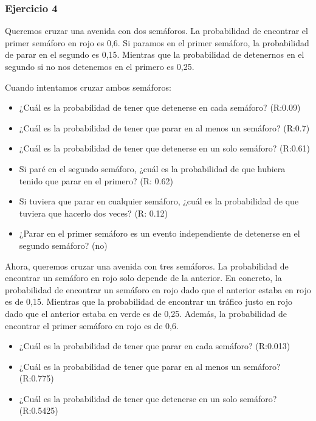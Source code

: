 \documentclass[
]{book}
\providecommand{\tightlist}{%
  \setlength{\itemsep}{0pt}\setlength{\parskip}{0pt}}
\begin{document}
\hypertarget{ejercicio-4}{%
\subsubsection{Ejercicio 4}\label{ejercicio-4}}

Queremos cruzar una avenida con dos semáforos. La probabilidad de encontrar el primer semáforo en rojo es 0,6. Si paramos en el primer semáforo, la probabilidad de parar en el segundo es 0,15. Mientras que la probabilidad de detenernos en el segundo si no nos detenemos en el primero es 0,25.

Cuando intentamos cruzar ambos semáforos:

\begin{itemize}
\tightlist
\item
  ¿Cuál es la probabilidad de tener que detenerse en cada semáforo? (R:0.09)
\item
  ¿Cuál es la probabilidad de tener que parar en al menos un semáforo? (R:0.7)
\item
  ¿Cuál es la probabilidad de tener que detenerse en un solo semáforo? (R:0.61)
\item
  Si paré en el segundo semáforo, ¿cuál es la probabilidad de que hubiera tenido que parar en el primero? (R: 0.62)
\item
  Si tuviera que parar en cualquier semáforo, ¿cuál es la probabilidad de que tuviera que hacerlo dos veces? (R: 0.12)
\item
  ¿Parar en el primer semáforo es un evento independiente de detenerse en el segundo semáforo? (no)
\end{itemize}

Ahora, queremos cruzar una avenida con tres semáforos. La probabilidad de encontrar un semáforo en rojo solo depende de la anterior. En concreto, la probabilidad de encontrar un semáforo en rojo dado que el anterior estaba en rojo es de 0,15. Mientras que la probabilidad de encontrar un tráfico justo en rojo dado que el anterior estaba en verde es de 0,25. Además, la probabilidad de encontrar el primer semáforo en rojo es de 0,6.

\begin{itemize}
\tightlist
\item
  ¿Cuál es la probabilidad de tener que parar en cada semáforo? (R:0.013)
\item
  ¿Cuál es la probabilidad de tener que parar en al menos un semáforo? (R:0.775)
\item
  ¿Cuál es la probabilidad de tener que detenerse en un solo semáforo? (R:0.5425)
\end{itemize}
\end{document}

